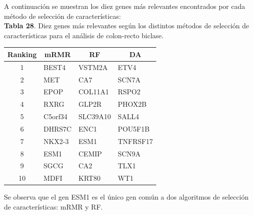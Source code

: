 \newpage
A continuación se muestran los diez genes más relevantes encontrados por cada método de selección de características:\\

\textbf{Tabla 28}. Diez genes más relevantes según los distintos métodos de selección de características para el análisis de colon-recto biclase.

\begin{table}[H]
	\centering
	\begin{tabular}{clll}
		\hline
		\textbf{Ranking} & \multicolumn{1}{c}{\textbf{mRMR}} & \multicolumn{1}{c}{\textbf{RF}} & \multicolumn{1}{c}{\textbf{DA}} \\ \hline
		1                & BEST4                             & VSTM2A                          & ETV4                            \\
		2                & MET                               & CA7                             & SCN7A                           \\
		3                & EPOP                              & COL11A1                         & RSPO2                           \\
		4                & RXRG                              & GLP2R                           & PHOX2B                          \\
		5                & C5orf34                           & SLC39A10                        & SALL4                           \\
		6                & DHRS7C                            & ENC1                            & POU5F1B                         \\
		7                & NKX2-3                            & ESM1                            & TNFRSF17                        \\
		8                & ESM1                              & CEMIP                           & SCN9A                           \\
		9                & SGCG                              & CA2                             & TLX1                            \\
		10               & MDFI                              & KRT80                           & WT1                             \\ \hline
	\end{tabular}
\end{table}

Se observa que el gen ESM1 es el único gen común a dos algoritmos de selección de características: mRMR y RF.


